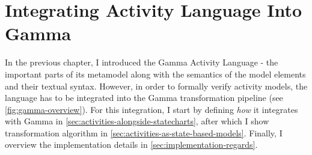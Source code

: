 \chapter{Integrating Activity Language Into Gamma}\label{ch:activiy_verification}

In the previous chapter, I introduced the Gamma Activity Language - the important parts of its metamodel along with the semantics of the model elements and their textual syntax. However, in order to formally verify activity models, the language has to be integrated into the Gamma transformation pipeline (see \autoref{fig:gamma-overview}). For this integration, I start by defining \emph{how} it integrates with Gamma in \autoref{sec:activities-alongside-statecharts}, after which I show transformation algorithm in \autoref{sec:activities-as-state-based-models}. Finally, I overview the implementation details in \autoref{sec:implementation-regards}. 




